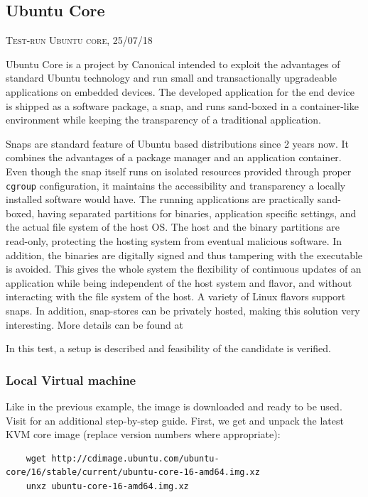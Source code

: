 \documentclass[]{scrartcl}
\begin{document}
\subsection{Ubuntu Core}
\label{sub:ubntcore}
{\small\textsc{Test-run Ubuntu core, 25/07/18} \bigskip}

Ubuntu Core is a project by Canonical intended to exploit the advantages of standard Ubuntu technology and run small and transactionally upgradeable applications on embedded devices. 
The developed application for the end device is shipped as a software package, a snap, and runs sand-boxed in a container-like environment while keeping the transparency of a traditional application. 

Snaps are standard feature of Ubuntu based distributions since 2 years now. It combines the advantages of a package manager and an application container. Even though the snap itself runs on isolated resources provided through proper \texttt{cgroup} configuration, it maintains the accessibility and transparency a locally installed software would have. 
The running applications are practically sand-boxed, having separated partitions for binaries, application specific settings, and the actual file system of the host OS. The host and the binary partitions are read-only, protecting the hosting system from eventual malicious software. 
In addition, the binaries are digitally signed and thus tampering with the executable is avoided. This gives the whole system the flexibility of continuous updates of an application while being independent of the host system and flavor, and without interacting with the file system of the host.
A variety of Linux flavors support snaps. In addition, snap-stores can be privately hosted, making this solution very interesting. More details can be found at \cite{snap01}

In this test, a setup is described and feasibility of the candidate is verified.

\subsubsection{Local Virtual machine}

Like in the previous example, the image is downloaded and ready to be used. Visit \cite{ubuntu01} for an additional step-by-step guide.
First, we get and unpack the latest KVM core image (replace version numbers where appropriate):

\begin{verbatim}
	wget http://cdimage.ubuntu.com/ubuntu-core/16/stable/current/ubuntu-core-16-amd64.img.xz
	unxz ubuntu-core-16-amd64.img.xz
\end{verbatim}
\end{document}
